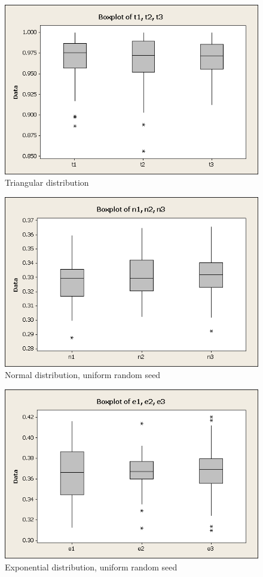 \documentclass[letterpaper,10pt]{article}
\begin{document}
\begin{figure}[htp]
\centering
\includegraphics[scale=0.50]{t1t2t3.png}
\caption{Triangular distribution}
\label{t1-3}
\end{figure}

\begin{figure}[htp]
\centering
\includegraphics[scale=0.50]{n1n2n3allSame.png}
\caption{Normal distribution, uniform random seed}
\label{n1-3-same}
\end{figure}

\begin{figure}[htp]
\centering
\includegraphics[scale=0.50]{e1e2e3allSame.png}
\caption{Exponential distribution, uniform random seed}
\label{e1-3-same}
\end{figure}
\end{document}
